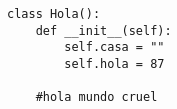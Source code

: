 \documentclass[10pt, a4paper]{article}
\author{Ricardo D. Quiroga - L2Radamanthys}
\begin{document}
\begin{lstlisting}
class Hola():
	def __init__(self):
		self.casa = ""
		self.hola =	87
	
	#hola mundo cruel
	
\end{lstlisting}
\end{document}
